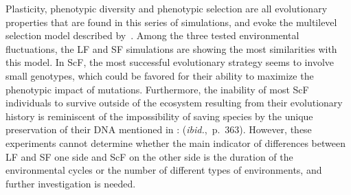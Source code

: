 Plasticity, phenotypic diversity and phenotypic selection are all evolutionary properties that are found in this series of simulations, and evoke the multilevel selection model described by~\citet{jablonka2014evolution}. Among the three tested environmental fluctuations, the LF and SF simulations are showing the most similarities with this model. In ScF, the most successful evolutionary strategy seems to involve small genotypes, which could be favored for their ability to maximize the phenotypic impact of mutations. Furthermore, the inability of most ScF individuals to survive outside of the ecosystem resulting from their evolutionary history is reminiscent of the impossibility of saving species by the unique preservation of their DNA mentioned in \cite{jablonka2014evolution}:  (\emph{ibid.},~p.~363). However, these experiments cannot determine whether the main indicator of differences between LF and SF one side and ScF on the other side is the duration of the environmental cycles or the number of different types of environments, and further investigation is needed.